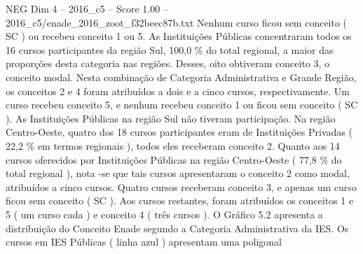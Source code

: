 \begin{textsample}{NEG Dim 4 – 2016\_c5 – Score 1.00 – 2016\_c5/enade\_2016\_zoot\_f32beec87b.txt}
Nenhum curso ficou sem conceito ( SC ) ou recebeu conceito 1 ou 5.
As Instituições Públicas concentraram todos os 16 cursos participantes da região Sul, 100,0 \% do total regional, a maior das proporções desta categoria nas regiões.
Desses, oito obtiveram conceito 3, o conceito modal.
Nesta combinação de Categoria Administrativa e Grande Região, os conceitos 2 e 4 foram atribuídos a dois e a cinco cursos, respectivamente.
Um curso recebeu conceito 5, e nenhum recebeu conceito 1 ou ficou sem conceito ( SC ).
As Instituições Públicas na região Sul não tiveram participação.
Na região Centro-Oeste, quatro dos 18 cursos participantes eram de Instituições Privadas ( 22,2 \% em termos regionais ), todos eles receberam conceito 2.
Quanto aos 14 cursos oferecidos por Instituições Públicas na região Centro-Oeste ( 77,8 \% do total regional ), nota -se que tais cursos apresentaram o conceito 2 como modal, atribuídos a cinco cursos.
Quatro cursos receberam conceito 3, e apenas um curso ficou sem conceito ( SC ).
Aos cursos restantes, foram atribuídos os conceitos 1 e 5 ( um curso cada ) e conceito 4 ( três cursos ).
O Gráfico 5.2 apresenta a distribuição do Conceito Enade segundo a Categoria Administrativa da IES.
Os cursos em IES Públicas ( linha azul ) apresentam uma poligonal

\end{textsample}

